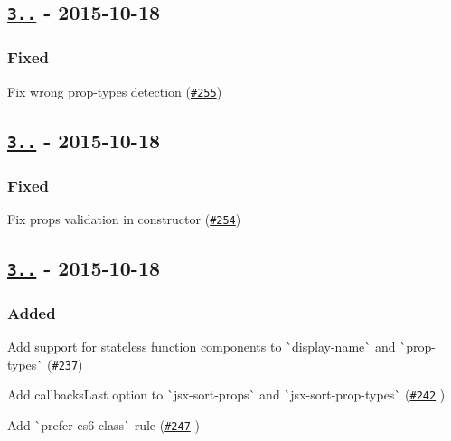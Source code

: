 \subsection*{\href{https://github.com/yannickcr/eslint-plugin-react/compare/v3.6.1...v3.6.2}{\tt 3..} -\/ 2015-\/10-\/18}

\subsubsection*{Fixed}


\begin{DoxyItemize}
\item Fix wrong prop-\/types detection (\href{https://github.com/yannickcr/eslint-plugin-react/issues/255}{\tt \#255})
\end{DoxyItemize}

\subsection*{\href{https://github.com/yannickcr/eslint-plugin-react/compare/v3.6.0...v3.6.1}{\tt 3..} -\/ 2015-\/10-\/18}

\subsubsection*{Fixed}


\begin{DoxyItemize}
\item Fix props validation in constructor (\href{https://github.com/yannickcr/eslint-plugin-react/issues/254}{\tt \#254})
\end{DoxyItemize}

\subsection*{\href{https://github.com/yannickcr/eslint-plugin-react/compare/v3.5.1...v3.6.0}{\tt 3..} -\/ 2015-\/10-\/18}

\subsubsection*{Added}


\begin{DoxyItemize}
\item Add support for stateless function components to \`{}display-\/name\`{} and \`{}prop-\/types\`{} (\href{https://github.com/yannickcr/eslint-plugin-react/issues/237}{\tt \#237})
\item Add callbacks\+Last option to \`{}jsx-\/sort-\/props\`{} and \`{}jsx-\/sort-\/prop-\/types\`{} (\href{https://github.com/yannickcr/eslint-plugin-react/pull/242}{\tt \#242} )
\item Add \`{}prefer-\/es6-\/class\`{} rule (\href{https://github.com/yannickcr/eslint-plugin-react/issues/247}{\tt \#247} )
\end{DoxyItemize}

